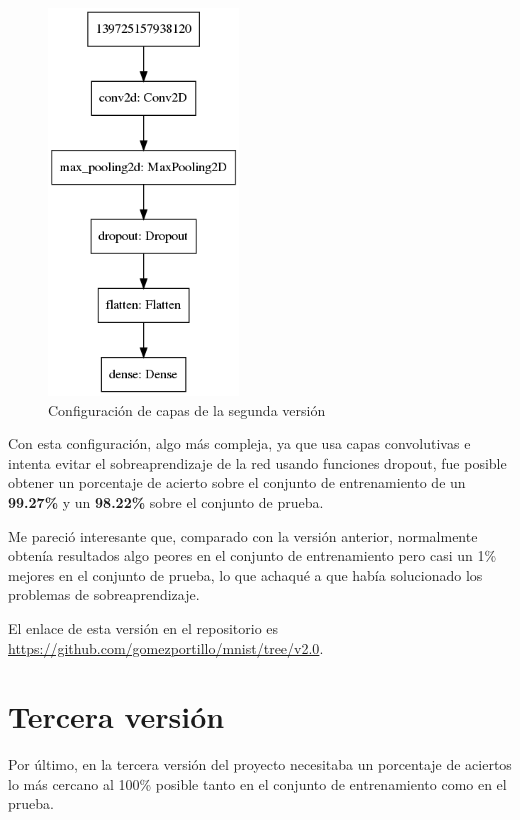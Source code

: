 \begin{figure}[H]
  \centering
  \includegraphics[width=0.45\textwidth]{../images/model-v2}
  \caption{Configuración de capas de la segunda versión}
  \label{fig:capas-v2}
\end{figure}

\bigskip

Con esta configuración, algo más compleja, ya que usa capas convolutivas e intenta evitar el sobreaprendizaje de la red usando funciones dropout, fue posible obtener un porcentaje de acierto sobre el conjunto de entrenamiento de un \textbf{99.27\%} y un \textbf{98.22\%} sobre el conjunto de prueba.

\bigskip

Me pareció interesante que, comparado con la versión anterior, normalmente obtenía resultados algo peores en el conjunto de entrenamiento pero casi un 1\% mejores en el conjunto de prueba, lo que achaqué a que había solucionado los problemas de sobreaprendizaje.

\bigskip

El enlace de esta versión en el repositorio es \url{https://github.com/gomezportillo/mnist/tree/v2.0}.

\section{Tercera versión}

Por último, en la tercera versión del proyecto necesitaba un porcentaje de aciertos lo más cercano al 100\% posible tanto en el conjunto de entrenamiento como en el prueba.

